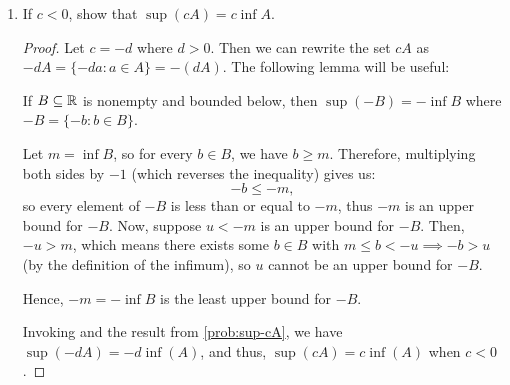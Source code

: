 \begin{problem}
\begin{enumerate}[label=(\alph*)]
\begin{proof}
        When $c > 0$, let us suppose for sake of contradiction that $cs$ is not the \textit{least} upper bound for $cA$. 
        This means $b = \sup(cA) < cs$ for some $b \in \R$. First, consider when $c > 0$. Dividing through by $c > 0$ gives us:
        \[
          \frac{b}{c} < s,
        \]
        so there exists some $a \in A$ such that:
        \[
          a > \frac{b}{c} \implies ca > b.
        \]
        However, a contradiction is reached because $ca \in cA$ and $b$ is supposed to be an upper bound for $cA$.

        Now consider the case when $c = 0$. In this case, $cA = \{0\}$, and thus $\sup(cA) = 0 = cs$. 

        Therefore, in both cases, we conclude that $cs$ is indeed the least upper bound for $cA$.
      \end{proof}

    \item If $c < 0$, show that $\sup(cA) = c \inf A$. \label{prob:sup-cA-negative}

      \begin{proof}

        Let $c = -d$ where $d > 0$. Then we can rewrite the set $cA$ as $-dA = \{-da : a \in A\} = -(dA)$. 
        The following lemma will be useful:

        \begin{lemma}\label{lem:sup-neg-bounded}
          If $B \subseteq \mathbb{R}$ is nonempty and bounded below, then $\sup(-B) = -\inf B$ 
          where $-B = \{-b : b \in B\}$.
        \end{lemma}

        \begin{subproof}
          Let $m = \inf B$, so for every $b \in B$, we have $b \geq m$.
          Therefore, multiplying both sides by $-1$ (which reverses the
          inequality) gives us:
          \[
            -b \leq -m,
          \]
          so every element of $-B$ is less than or equal to $-m$, thus $-m$ is
          an upper bound for $-B$. Now, suppose $u < -m$ is an upper bound for
          $-B$. Then,  $-u > m$, which means there exists some $b \in B$ with
          $m \leq b < -u \implies -b > u$ (by the definition of the infimum),
          so $u$ cannot be an upper bound for $-B$.

          Hence, $-m = -\inf B$ is the least upper bound for $-B$. 
        \end{subproof}

        Invoking  and the result from \ref{prob:sup-cA},
        we have $\sup(-dA) = -d \inf(A)$, and thus, $\sup(cA) = c \inf(A)$ when
        $c < 0$. 

      \end{proof}

  \end{enumerate}
\end{problem}


